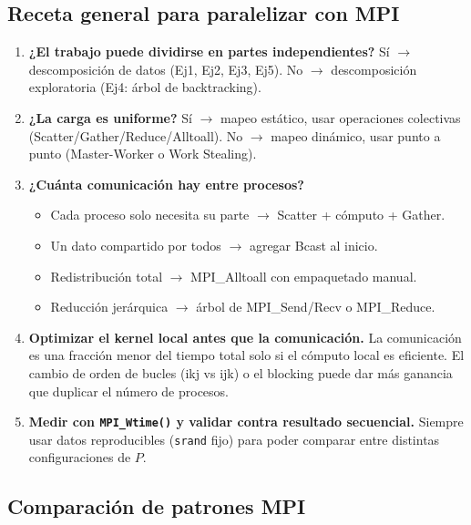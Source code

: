 \documentclass[12pt,a4paper]{article}
\begin{document}
\subsection*{Receta general para paralelizar con MPI}

\begin{enumerate}[leftmargin=*, label=\textbf{Paso \arabic*.}]
  \item \textbf{¿El trabajo puede dividirse en partes independientes?}
    Sí $\to$ descomposición de datos (Ej1, Ej2, Ej3, Ej5).
    No $\to$ descomposición exploratoria (Ej4: árbol de backtracking).

  \item \textbf{¿La carga es uniforme?}
    Sí $\to$ mapeo estático, usar operaciones colectivas (Scatter/Gather/Reduce/Alltoall).
    No $\to$ mapeo dinámico, usar punto a punto (Master-Worker o Work Stealing).

  \item \textbf{¿Cuánta comunicación hay entre procesos?}
    \begin{itemize}
      \item Cada proceso solo necesita su parte $\to$ Scatter + cómputo + Gather.
      \item Un dato compartido por todos $\to$ agregar Bcast al inicio.
      \item Redistribución total $\to$ MPI\_Alltoall con empaquetado manual.
      \item Reducción jerárquica $\to$ árbol de MPI\_Send/Recv o MPI\_Reduce.
    \end{itemize}

  \item \textbf{Optimizar el kernel local antes que la comunicación.}
    La comunicación es una fracción menor del tiempo total solo si el cómputo
    local es eficiente. El cambio de orden de bucles (ikj vs ijk) o el blocking
    puede dar más ganancia que duplicar el número de procesos.

  \item \textbf{Medir con \texttt{MPI\_Wtime()} y validar contra resultado secuencial.}
    Siempre usar datos reproducibles (\texttt{srand} fijo) para poder comparar
    entre distintas configuraciones de $P$.
\end{enumerate}

\subsection*{Comparación de patrones MPI}
\end{document}
